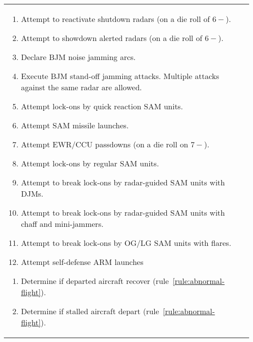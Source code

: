 \begin{twocolumntable}
\begin{tabularx}{1.0\linewidth}{L@{\hspace{\columnsep}}L}
{\begin{enumerate}[topsep=0pt]
\begin{enumerate}[nosep]
    \item Attempt to reactivate shutdown radars (on a die roll of $6-$).
    \item Attempt to showdown alerted radars (on a die roll of $6-$).
    \item Declare BJM noise jamming arcs.
    \item Execute BJM stand-off jamming attacks. Multiple attacks against the same radar are allowed.
    \item Attempt lock-ons by quick reaction SAM units.
    \item Attempt SAM missile launches.
    \item Attempt EWR/CCU passdowns (on a die roll on $7-$).
    \item Attempt lock-ons by regular SAM units.
    \item Attempt to break lock-ons by radar-guided SAM units with DJMs.
    \item Attempt to break lock-ons by radar-guided SAM units with chaff and mini-jammers.
    \item Attempt to break lock-ons by OG/LG SAM units with flares.
    \item Attempt self-defense ARM launches
\end{enumerate}


\begin{enumerate}[nosep]
    \item Determine if departed aircraft recover (rule~\ref{rule:abnormal-flight}).
    \item Determine if stalled aircraft depart (rule~\ref{rule:abnormal-flight}).
\end{enumerate}



\end{enumerate}}
\end{tabularx}
\end{twocolumntable}
